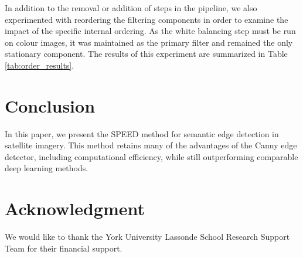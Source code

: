\documentclass[conference]{IEEEtran}
\begin{document}
In addition to the removal or addition of steps in the pipeline, we also experimented with reordering the filtering components in order to examine the impact of the specific internal ordering. As the white balancing step must be run on colour images, it was maintained as the primary filter and remained the only stationary component. The results of this experiment are summarized in Table \ref{tab:order_results}.

\section{Conclusion}

In this paper, we present the SPEED method for semantic edge detection in satellite imagery. This method retains many of the advantages of the Canny edge detector, including computational efficiency, while still outperforming comparable deep learning methods.


\section*{Acknowledgment}

We would like to thank the York University Lassonde School Research Support Team for their financial support.

{\small


}
\end{document}
